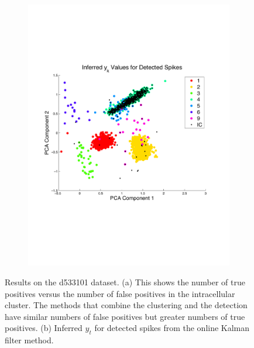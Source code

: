 \begin{center}
\begin{figure}
\begin{subfigure}[b]{.5\textwidth}
\end{subfigure}
\begin{subfigure}[b]{.5\textwidth}
\includegraphics[width=\textwidth]{../figs/ykarreduced}
\caption{}
\label{pcaonlinear}
\end{subfigure}
\caption{Results on the d533101 dataset.  (a) This shows the number of true positives versus the number of false positives in the intracellular cluster.  The methods that combine the clustering and the detection have similar numbers of false positives but greater numbers of true positives.  (b) Inferred $y_t$ for detected spikes from the online Kalman filter method.}
\end{figure}
\end{center}
